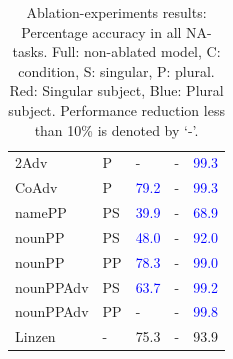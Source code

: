 \begin{center}
\begin{table}[ht]
\begin{tabular}{|P{2.3cm}|P{0.4cm}||P{0.6cm}|P{0.6cm}|P{0.6cm}|}
2Adv & P & - &  - &   \textcolor{blue}{99.3} \\

CoAdv & P &  \textcolor{blue}{79.2} &  - &   \textcolor{blue}{99.3} \\

namePP & PS & \textcolor{blue}{39.9} &  - &   \textcolor{blue}{68.9} \\

nounPP & PS &  \textcolor{blue}{48.0} & - &   \textcolor{blue}{92.0} \\

nounPP & PP &  \textcolor{blue}{78.3} & - &   \textcolor{blue}{99.0} \\

nounPPAdv & PS & \textcolor{blue}{63.7} &  - &   \textcolor{blue}{99.2} \\

nounPPAdv & PP & - &  - &   \textcolor{blue}{99.8} \\

\hline

\B Linzen & \B - &   75.3 &  - &  93.9 \\
\hline

\end{tabular}
\caption{Ablation-experiments results: Percentage accuracy in all NA-tasks. Full: non-ablated model, C: condition, S: singular, P: plural. Red: Singular subject, Blue: Plural subject. Performance reduction less than 10\% is denoted by `-'.  \label{tab:ablation-results}}
\end{table}
\end{center}

